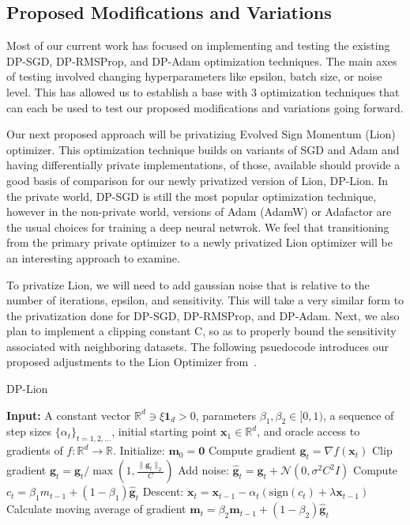 \subsection{Proposed Modifications and Variations}\label{subsec:modification-and-variations}
Most of our current work has focused on implementing and testing the existing DP-SGD, DP-RMSProp, and DP-Adam optimization techniques. The main axes
of testing involved changing hyperparameters like epsilon, batch size, or noise level. This has allowed us to establish a base with 3 optimization techniques
that can each be used to test our proposed modifications and variations going forward.

Our next proposed approach will be privatizing Evolved Sign Momentum (Lion) optimizer. This optimization technique builds on variants of SGD and Adam and having 
differentially private implementations, of those, available should provide a good basis of comparison for our newly privatized version of Lion, DP-Lion. In the private world,
DP-SGD is still the most popular optimization technique, however in the non-private world, versions of Adam (AdamW) or Adafactor are the usual choices for training
a deep neural netwrok. \cite{chen2023symbolicdiscoveryoptimizationalgorithms} We feel that transitioning from the primary private optimizer to a newly privatized Lion optimizer
will be an interesting approach to examine.

To privatize Lion, we will need to add gaussian noise that is relative to the number of iterations, epsilon, and sensitivity. This will take a very similar form to the privatization
done for DP-SGD, DP-RMSProp, and DP-Adam. Next, we also plan to implement a clipping constant C, so as to properly bound the sensitivity associated with neighboring datasets. The following psuedocode
introduces our proposed adjustments to the Lion Optimizer from~\cite{chen2023symbolicdiscoveryoptimizationalgorithms}.


\begin{algorithm}
    \caption{DP-Lion}
    \label{alg:lion}
    \begin{algorithmic}[1]
        \State \textbf{Input:} A constant vector $\mathbb{R}^d \ni \xi \mathbf{1}_d > 0$, parameters $\beta_1, \beta_2 \in [0, 1)$, a sequence of step sizes $\{\alpha_t\}_{t=1,2,\dots}$, initial starting point $\mathbf{x}_1 \in \mathbb{R}^d$, and oracle access to gradients of $f : \mathbb{R}^d \to \mathbb{R}$.
        \State Initialize: $\mathbf{m}_0 = \mathbf{0}$
            \State Compute gradient $\mathbf{g}_t = \nabla f(\mathbf{x}_t)$
            \State Clip gradient $\mathbf{g}_t = \mathbf{g}_t / \max(1, \frac{\lVert \mathbf{g}_t \rVert_2}{C})$
            \State Add noise: $\hat{\mathbf{g}}_t = \mathbf{g}_t + \mathcal{N}(0, \sigma^2 C^2 I)$
            \State Compute $c_{t} = \beta_1 m_{t-1} + (1 - \beta_1) \hat{\mathbf{g}}_t$
            \State Descent: $\mathbf{x}_t = \mathbf{x}_{t-1} - \alpha_t (\text{sign}(c_{t}) + \lambda \mathbf{x}_{t-1})$
            \State Calculate moving average of gradient $\mathbf{m}_t = \beta_2 \mathbf{m}_{t-1} + (1 - \beta_2) \hat{\mathbf{g}}_t$
        \EndFor
    \end{algorithmic}
\end{algorithm}


